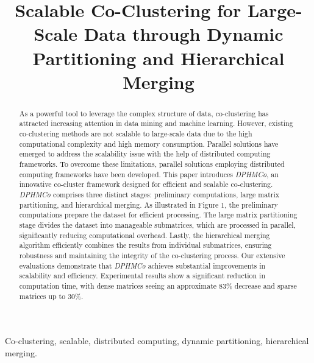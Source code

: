 \documentclass[journal]{IEEEtran}
\begin{document}
\title{\LARGE \bf Scalable Co-Clustering for Large-Scale Data through Dynamic Partitioning and Hierarchical Merging}


\author{}
\maketitle

\begin{abstract}
  As a powerful tool to leverage the complex structure of data, co-clustering has attracted increasing attention in data mining and machine learning. However, existing co-clustering methods are not scalable to large-scale data due to the high computational complexity and high memory consumption. Parallel solutions have emerged to address the scalability issue with the help of distributed computing frameworks. To overcome these limitations, parallel solutions employing distributed computing frameworks have been developed. This paper introduces \emph{DPHMCo}, an innovative co-cluster framework designed for efficient and scalable co-clustering. \emph{DPHMCo} comprises three distinct stages: preliminary computations, large matrix partitioning, and hierarchical merging. As illustrated in Figure 1, the preliminary computations prepare the dataset for efficient processing. The large matrix partitioning stage divides the dataset into manageable submatrices, which are processed in parallel, significantly reducing computational overhead. Lastly, the hierarchical merging algorithm efficiently combines the results from individual submatrices, ensuring robustness and maintaining the integrity of the co-clustering process. Our extensive evaluations demonstrate that \emph{DPHMCo} achieves substantial improvements in scalability and efficiency. Experimental results show a significant reduction in computation time, with dense matrices seeing an approximate 83\% decrease and sparse matrices up to 30\%.
\end{abstract}

\begin{IEEEkeywords}
  Co-clustering, scalable, distributed computing, dynamic partitioning, hierarchical merging.
\end{IEEEkeywords}
\end{document}
